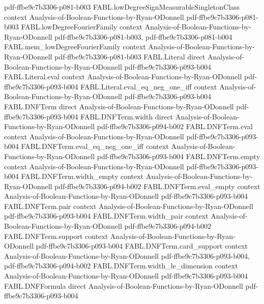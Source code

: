 \begin{theorem}
  {pdf-ffbe9c7b3306-p081-b003}
\proofstep
  {FABL.lowDegreeSignMeasurableSingletonClass}
  {context}
  {Analysis-of-Boolean-Functions-by-Ryan-ODonnell}
  {pdf-ffbe9c7b3306-p081-b003}
\proofstep
  {FABL.lowDegreeFourierFamily}
  {context}
  {Analysis-of-Boolean-Functions-by-Ryan-ODonnell}
  {pdf-ffbe9c7b3306-p081-b003,
    pdf-ffbe9c7b3306-p081-b004}
\proofstep
  {FABL.mem_lowDegreeFourierFamily}
  {context}
  {Analysis-of-Boolean-Functions-by-Ryan-ODonnell}
  {pdf-ffbe9c7b3306-p081-b003}
\proofstep
  {FABL.Literal}
  {direct}
  {Analysis-of-Boolean-Functions-by-Ryan-ODonnell}
  {pdf-ffbe9c7b3306-p093-b004}
\proofstep
  {FABL.Literal.eval}
  {context}
  {Analysis-of-Boolean-Functions-by-Ryan-ODonnell}
  {pdf-ffbe9c7b3306-p093-b004}
\proofstep
  {FABL.Literal.eval_eq_neg_one_iff}
  {context}
  {Analysis-of-Boolean-Functions-by-Ryan-ODonnell}
  {pdf-ffbe9c7b3306-p093-b004}
\proofstep
  {FABL.DNFTerm}
  {direct}
  {Analysis-of-Boolean-Functions-by-Ryan-ODonnell}
  {pdf-ffbe9c7b3306-p093-b004}
\proofstep
  {FABL.DNFTerm.width}
  {direct}
  {Analysis-of-Boolean-Functions-by-Ryan-ODonnell}
  {pdf-ffbe9c7b3306-p094-b002}
\proofstep
  {FABL.DNFTerm.eval}
  {context}
  {Analysis-of-Boolean-Functions-by-Ryan-ODonnell}
  {pdf-ffbe9c7b3306-p093-b004}
\proofstep
  {FABL.DNFTerm.eval_eq_neg_one_iff}
  {context}
  {Analysis-of-Boolean-Functions-by-Ryan-ODonnell}
  {pdf-ffbe9c7b3306-p093-b004}
\proofstep
  {FABL.DNFTerm.empty}
  {context}
  {Analysis-of-Boolean-Functions-by-Ryan-ODonnell}
  {pdf-ffbe9c7b3306-p093-b004}
\proofstep
  {FABL.DNFTerm.width_empty}
  {context}
  {Analysis-of-Boolean-Functions-by-Ryan-ODonnell}
  {pdf-ffbe9c7b3306-p094-b002}
\proofstep
  {FABL.DNFTerm.eval_empty}
  {context}
  {Analysis-of-Boolean-Functions-by-Ryan-ODonnell}
  {pdf-ffbe9c7b3306-p093-b004}
\proofstep
  {FABL.DNFTerm.pair}
  {context}
  {Analysis-of-Boolean-Functions-by-Ryan-ODonnell}
  {pdf-ffbe9c7b3306-p093-b004}
\proofstep
  {FABL.DNFTerm.width_pair}
  {context}
  {Analysis-of-Boolean-Functions-by-Ryan-ODonnell}
  {pdf-ffbe9c7b3306-p094-b002}
\proofstep
  {FABL.DNFTerm.support}
  {context}
  {Analysis-of-Boolean-Functions-by-Ryan-ODonnell}
  {pdf-ffbe9c7b3306-p093-b004}
\proofstep
  {FABL.DNFTerm.card_support}
  {context}
  {Analysis-of-Boolean-Functions-by-Ryan-ODonnell}
  {pdf-ffbe9c7b3306-p093-b004,
    pdf-ffbe9c7b3306-p094-b002}
\proofstep
  {FABL.DNFTerm.width_le_dimension}
  {context}
  {Analysis-of-Boolean-Functions-by-Ryan-ODonnell}
  {pdf-ffbe9c7b3306-p093-b004}
\proofstep
  {FABL.DNFFormula}
  {direct}
  {Analysis-of-Boolean-Functions-by-Ryan-ODonnell}
  {pdf-ffbe9c7b3306-p093-b004}

\end{theorem}
